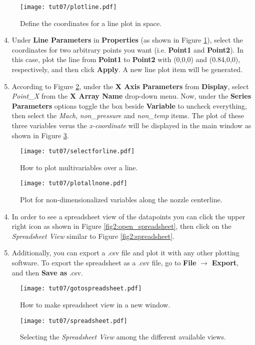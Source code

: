 \begin{figure}[ht]
	\centering
	\texttt{[image: tut07/plotline.pdf]}
	\caption{Define the coordinates for a line plot in space.}
	\label{fig7:line_coordinate}
\end{figure}
\begin{enumerate}[label=\arabic*)]
	\setcounter{enumi}{3}
	\item Under \textbf{Line Parameters} in \textbf{Properties} (as shown in Figure \ref{fig7:line_coordinate}), select the coordinates for two arbitrary points you want (i.e. \textbf{Point1} and \textbf{Point2}). In this case, plot the line from \textbf{Point1} to \textbf{Point2} with (0,0,0) and (0.84,0,0), respectively, and then click \textbf{Apply}. A new line plot item will be generated.
	\item  According to Figure \ref{fig7:plot3nonvar}, under the \textbf{X Axis Parameters} from \textbf{Display}, select \textit{Point\_X} from the \textbf{X Array Name} drop-down menu. Now, under the \textbf{Series Parameters} options toggle the box beside \textbf{Variable} to uncheck everything, then select the \textit{Mach}, \textit{non\_pressure} and \textit{non\_temp} items. The plot of these three variables verus the \textit{x-coordinate} will be displayed in the main window as shown in Figure \ref{fig7:plot_line}.
\end{enumerate}
\begin{figure}[H]
	\centering
	\texttt{[image: tut07/selectforline.pdf]}
	\caption{How to plot multivariables over a line.}
	\label{fig7:plot3nonvar}
\end{figure}
\begin{figure}[ht]
	\centering
	\texttt{[image: tut07/plotallnone.pdf]}
	\caption{Plot for non-dimensionalized variables along the nozzle centerline.}
	\label{fig7:plot_line}
\end{figure}
\begin{enumerate}[label=\arabic*)]
	\setcounter{enumi}{3}
	\item In order to see a spreadsheet view of the datapoints you can click the upper right icon as shown in Figure \ref{fig2:open_spreadsheet}, then click on the \textit{Spreadsheet View} similar to Figure \ref{fig2:spreadsheet}.
	\item Additionally, you can export a .csv file and plot it with any other plotting software. To export the spreadsheet as a .csv file, go to \textbf{File} $\rightarrow$ \textbf{Export}, and then \textbf{Save as} .csv.
\end{enumerate}
\begin{figure}[ht]
	\centering
	\texttt{[image: tut07/gotospreadsheet.pdf]}
	\caption{How to make spreadsheet view in a new window.}
	\label{fig7:open_spreadsheet}
\end{figure}
\begin{figure}[H]
	\centering
	\texttt{[image: tut07/spreadsheet.pdf]}
	\caption{Selecting the \textit{Spreadsheet View} among the different available views.}
	\label{fig7:spreadsheet}
\end{figure}

